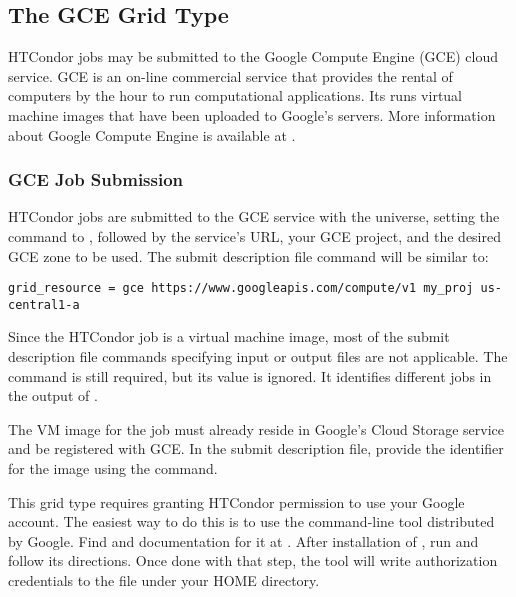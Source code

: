 \subsection{\label{sec:Gce}The GCE Grid Type }

HTCondor jobs may be submitted to the Google Compute Engine (GCE)
cloud service.
GCE is an on-line commercial service that provides
the rental of computers by the hour to run computational applications.
Its runs virtual machine images that have been uploaded to Google's
servers.
More information about Google Compute Engine is available at
.

\subsubsection{\label{sec:Gce-submit}GCE Job Submission}

HTCondor jobs are submitted to the GCE service
with the  universe, setting the
 command to , followed 
by the service's URL, your GCE project, 
and the desired GCE zone to be used.
The submit description file command will be similar to:
\begin{verbatim}
grid_resource = gce https://www.googleapis.com/compute/v1 my_proj us-central1-a
\end{verbatim}

Since the HTCondor job is a virtual machine image,
most of the submit description file commands
specifying input or output files are not applicable.
The  command is still required,
but its value is ignored. 
It identifies different jobs in the output of .

The VM image for the job must already reside in Google's Cloud Storage
service and be registered with GCE.
In the submit description file,
provide the identifier for the image using
the  command.

This grid type requires granting HTCondor permission to use your
Google account. 
The easiest way to do this is to use the 
command-line tool distributed by Google.
Find  and documentation for it at
.
After installation of , 
run  and follow its directions.
Once done with that step,
the tool will write authorization credentials to the
file  under your HOME directory.

